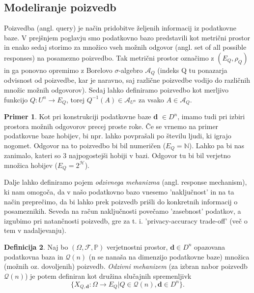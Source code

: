 \documentclass[12pt,a4paper]{amsart}
\theoremstyle{definition} %
\newtheorem{definicija}{Definicija}[section]
\newtheorem{primer}[definicija]{Primer}
\theoremstyle{plain} %
\begin{document}
\subsection{Modeliranje poizvedb}
Poizvedba (angl. query) je način pridobitve željenih informacij iz podatkovne baze. V prejšnjem poglavju smo podatkovno bazo predstavili kot metrični prostor in enako sedaj storimo za množico vseh možnih odgovor (angl. set of all possible responses) na posamezno poizvedbo. Tak metrični prostor označimo z $(E_{Q}, \rho_{Q})$ in ga ponovno opremimo z Borelovo $\sigma$-algebro $\mathcal{A}_{Q}$ (indeks Q tu ponazarja odvisnost od poizvedbe, kar je naravno, saj različne poizvedbe vodijo do različnih množic možnih odgovorov). Sedaj lahko definiramo poizvedbo kot merljivo funkcijo $Q: U^n \rightarrow E_{Q} $, torej $Q^{-1}(A) \in \mathcal{A}_{U^n}$ za vsako $A \in \mathcal{A}_Q$.
\begin{primer} Kot pri konstrukciji podatkovne baze \textbf{d} $\in D^n$, imamo tudi pri izbiri prostora možnih odgovorov precej proste roke. Če se vrnemo na primer podatkovne baze hobijev, bi npr. lahko povprašali po številu ljudi, ki igrajo nogomet. Odgovor na to poizvedbo bi bil numeričen ($E_{Q} = \mathbb{N}$). Lahko pa bi nas zanimalo, kateri so 3 najpogostejši hobiji v bazi. Odgovor tu bi bil verjetno množica hobijev  ($E_{Q} = 2^\mathcal{H}$).
\end{primer}
\newline
\newline
Dalje lahko definiramo pojem \textit{odzivnega mehanizma} (angl. response mechanism), ki nam omogoča, da v našo podatkovno bazo vnesemo 'naključnost' in na ta način preprečimo, da bi lahko prek poizvedb prišli do konkretnih informacij o posameznikih. Seveda na račun naključnosti povečamo 'zasebnost' podatkov, a izgubimo pri natančnosti poizvedb, gre za t. i. 'privacy-accuracy trade-off' (več o tem v nadaljevanju). 
\begin{definicija}
Naj bo $(\Omega , \mathcal{F}, \mathbb {P} )$ verjetnostni prostor, $\textbf{d}\in D^n$ opazovana podatkovna baza in $\mathcal{Q}(n)$ (n se nanaša na dimenzijo podatkovne baze) množica (možnih oz. dovoljenih) poizvedb. \textit{Odzivni mehanizem} (za izbran nabor poizvedb $\mathcal{Q}(n)$) je potem definiran kot družina slučajnih spremenljivk
\begin{equation}\label{odzivni}
 \{X_{Q,\textbf{d}} : \Omega \rightarrow  E_{Q} | Q \in  \mathcal{Q} (n), \textbf{d} \in D^n\} \tag{1}.
\end{equation} 
\end{definicija}
\end{document}
